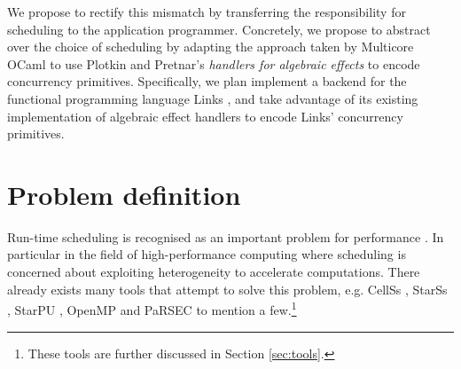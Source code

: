 \documentclass[preprint,10pt,numbers]{sigplanconf}
\begin{document}
We propose to rectify this mismatch by transferring the responsibility for scheduling to the application programmer. Concretely, we propose to abstract over the choice of scheduling by adapting the approach taken by Multicore OCaml \cite{Dolan2015} to use Plotkin and Pretnar's \emph{handlers for algebraic effects} \cite{Plotkin2013} to encode concurrency primitives. Specifically, we plan implement a backend for the functional programming language Links \cite{Cooper2006}, and take advantage of its existing implementation of algebraic effect handlers \cite{Hillerstrom2015} to encode Links' concurrency primitives.




  \section{Problem definition}\label{sec:problemdefinition}
Run-time scheduling is recognised as an important problem for performance \cite{Augonnet2011,Augonnet2012,Agullo2015,Openmp2013}. In particular in the field of high-performance computing where scheduling is concerned about exploiting heterogeneity to accelerate computations. There already exists many tools that attempt to solve this problem, e.g. CellSs \cite{Bellens2009}, StarSs \cite{Planas2009}, StarPU \cite{Augonnet2011}, OpenMP \cite{Openmp2013} and PaRSEC \cite{Bosilca2013} to mention a few.\footnote{These tools are further discussed in Section \ref{sec:tools}.}
\end{document}
